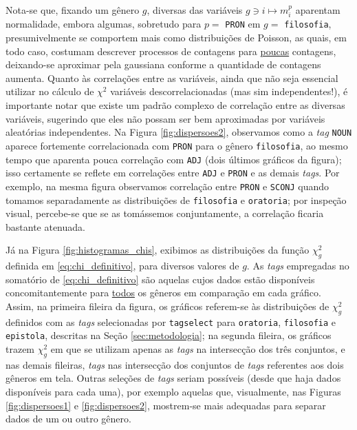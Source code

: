 \documentclass[10pt,a4paper,onecolumn]{article}
\theoremstyle{definition}
\theoremstyle{remark}
\begin{document}
\break

Nota-se que, fixando um gênero $g$, diversas das variáveis $g \ni i \mapsto m^p_i$ aparentam normalidade, embora algumas, sobretudo para $p = $ \texttt{PRON} em $g = $ \texttt{filosofia}, presumivelmente se comportem mais como distribuições de Poisson, as quais, em todo caso, costumam descrever processos de contagens para \underline{poucas} contagens, deixando-se aproximar pela gaussiana conforme a quantidade de contagens aumenta. Quanto às correlações entre as variáveis, ainda que não seja essencial utilizar no cálculo de $\chi^2$ variáveis descorrelacionadas (mas sim independentes!), é importante notar que existe um padrão complexo de correlação entre as diversas variáveis, sugerindo que eles não possam ser bem aproximadas por variáveis aleatórias independentes. Na Figura \ref{fig:dispersoes2}, observamos como a \emph{tag} \texttt{NOUN} aparece fortemente correlacionada com \texttt{PRON} para o gênero \texttt{filosofia}, ao mesmo tempo que aparenta pouca correlação com \texttt{ADJ} (dois últimos gráficos da figura); isso certamente se reflete em correlações entre \texttt{ADJ} e \texttt{PRON} e as demais \emph{tags}. Por exemplo, na mesma figura observamos correlação entre \texttt{PRON} e \texttt{SCONJ} quando tomamos separadamente as distribuições de \texttt{filosofia} e \texttt{oratoria}; por inspeção visual, percebe-se que se as tomássemos conjuntamente, a correlação ficaria bastante atenuada. 

Já na Figura \ref{fig:histogramas_chis}, exibimos as distribuições da função $\chi^2_g$ definida em \eqref{eq:chi_definitivo}, para diversos valores de $g$. As \emph{tags} empregadas no somatório de \eqref{eq:chi_definitivo} são aquelas cujos dados estão disponíveis concomitantemente para \underline{todos} os gêneros em comparação em cada gráfico. Assim, na primeira fileira da figura, os gráficos referem-se às distribuições de $\chi^2_g$ definidos com as \emph{tags} selecionadas por \texttt{tagselect} para \texttt{oratoria}, \texttt{filosofia} e \texttt{epistola}, descritas na Seção \ref{sec:metodologia}; na segunda fileira, os gráficos trazem $\chi^2_g$ em que se utilizam apenas as \emph{tags} na intersecção dos três conjuntos, e nas demais fileiras, \emph{tags} nas intersecção dos conjuntos de \emph{tags} referentes aos dois gêneros em tela. Outras seleções de \emph{tags} seriam possíveis (desde que haja dados disponíveis para cada uma), por exemplo aquelas que, visualmente, nas Figuras \ref{fig:dispersoes1} e \ref{fig:dispersoes2}, mostrem-se mais adequadas para separar dados de um ou outro gênero.
\end{document}
